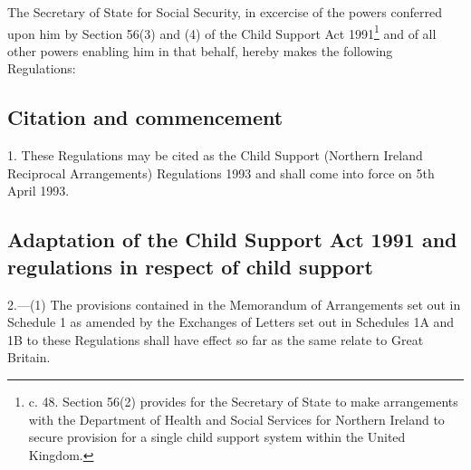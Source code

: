 \documentclass[12pt,a4paper]{article}
\title{\regstitle}
\author{S.I. 1993 No. 584}
\date{Made 10th March 1993\\Laid before Parliament 15th March 1993\\Coming into force 5th April 1993}
\begin{document}
\maketitle

\noindent
The Secretary of State for Social Security, in excercise of the powers conferred upon him by Section 56(3) and (4) of the Child Support Act 1991\footnote{ c. 48. Section 56(2) provides for the Secretary of State to make arrangements with the Department of Health and Social Services for Northern Ireland to secure provision for a single child support system within the United Kingdom.} and of all other powers enabling him in that behalf, hereby makes the following Regulations:

{\sloppy

\tableofcontents

}

\setcounter{secnumdepth}{-2}

\subsection[1. Citation and commencement]{Citation and commencement}

1.  These Regulations may be cited as the Child Support (Northern Ireland Reciprocal Arrangements) Regulations 1993 and shall come into force on 5th April 1993.

\subsection[2. Adaptation of the Child Support Act 1991 and regulations in respect of child support]{Adaptation of the Child Support Act 1991 and regulations in respect of child support}

2.—(1) The provisions contained in the Memorandum of Arrangements set out in Schedule 1 
as amended by the 
Exchanges of Letters set out in Schedules 1A and 1B  %
to these Regulations shall have effect so far as the same relate to Great Britain.
\end{document}
